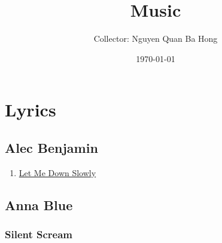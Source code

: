 \documentclass{book}
\title{Music}
\author{Collector: Nguyen Quan Ba Hong}
\date{\today}
\numberwithin{equation}{section}
\begin{document}
\maketitle
\setcounter{secnumdepth}{6}
\setcounter{tocdepth}{6}
\tableofcontents


\part{Lyrics}

\chapter{Alec Benjamin}

\begin{enumerate}
    \item \href{https://www.youtube.com/watch?v=50VNCymT-Cs}{Let Me Down Slowly}
\end{enumerate}


\chapter{Anna Blue}

\section{Silent Scream}
\end{document}
